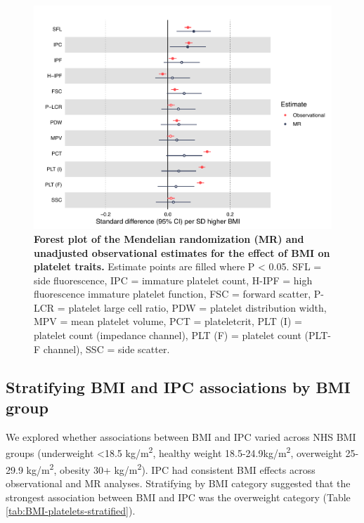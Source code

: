 \documentclass[11pt,twoside]{bristolthesis}
\begin{document}
\begin{figure}
\includegraphics[width=0.9\linewidth]{figure/BMI_platelets/BMI_platelet_forestplot} \caption[Forest plot of the Mendelian randomization and unadjusted observational estimates for the effect of BMI on platelet traits]{\textbf{Forest plot of the Mendelian randomization (MR) and unadjusted observational estimates for the effect of BMI on platelet traits.} Estimate points are filled where P \textless{} 0.05. SFL = side fluorescence, IPC = immature platelet count, H-IPF = high fluorescence immature platelet function, FSC = forward scatter, P-LCR = platelet large cell ratio, PDW = platelet distribution width, MPV = mean platelet volume, PCT = plateletcrit, PLT (I) = platelet count (impedance channel), PLT (F) = platelet count (PLT-F channel), SSC = side scatter.}\label{fig:BMI-platelet-forest}
\end{figure}
\hypertarget{stratifying-bmi-and-ipc-associations-by-bmi-group}{%
\subsection{Stratifying BMI and IPC associations by BMI group}\label{stratifying-bmi-and-ipc-associations-by-bmi-group}}

We explored whether associations between BMI and IPC varied across NHS BMI groups (underweight \textless18.5 kg/m\textsuperscript{2}, healthy weight 18.5-24.9kg/m\textsuperscript{2}, overweight 25-29.9 kg/m\textsuperscript{2}, obesity 30+ kg/m\textsuperscript{2}). IPC had consistent BMI effects across observational and MR analyses. Stratifying by BMI category suggested that the strongest association between BMI and IPC was the overweight category (Table \ref{tab:BMI-platelets-stratified}).
\end{document}
